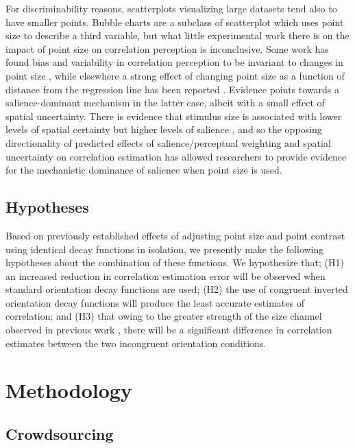 \documentclass[manuscript, review, anonymous, screen]{acmart}
\begin{document}
For discriminability reasons, scatterplots visualizing large datasets
tend also to have smaller points. Bubble charts are a subclass of
scatterplot which uses point size to describe a third variable, but what
little experimental work there is on the impact of point size on
correlation perception is inconclusive. Some work has found bias and
variability in correlation perception to be invariant to changes in
point size \citep{rensink_2012, rensink_2014}, while elsewhere a strong
effect of changing point size as a function of distance from the
regression line has been reported \citep{strain_2023b}. Evidence points
towards a salience-dominant mechanism in the latter case, albeit with a
small effect of spatial uncertainty. There is evidence that stimulus
size is associated with lower levels of spatial certainty
\citep{alais_2004} but higher levels of salience \citep{healey_2011},
and so the opposing directionality of predicted effects of
salience/perceptual weighting and spatial uncertainty on correlation
estimation has allowed researchers to provide evidence for the
mechanistic dominance of salience when point size is used.

\hypertarget{hypotheses}{%
\subsection{Hypotheses}\label{hypotheses}}

Based on previously established effects of adjusting point size and
point contrast using identical decay functions in isolation, we
presently make the following hypotheses about the combination of these
functions. We hypothesize that; (H1) an increased reduction in
correlation estimation error will be observed when standard orientation
decay functions are used; (H2) the use of congruent inverted orientation
decay functions will produce the least accurate estimates of
correlation; and (H3) that owing to the greater strength of the size
channel observed in previous work \citep{strain_2023b}, there will be a
significant difference in correlation estimates between the two
incongruent orientation conditions.

\hypertarget{sec-methods}{%
\section{Methodology}\label{sec-methods}}

\hypertarget{sec-crowdsourcing}{%
\subsection{Crowdsourcing}\label{sec-crowdsourcing}}
\end{document}
